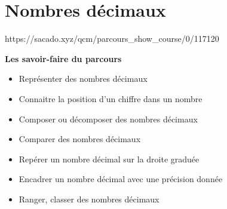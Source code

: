 \chapter{Nombres décimaux}
{https://sacado.xyz/qcm/parcours_show_course/0/117120}
{ 

 \begin{CpsCol}
 \textbf{Les savoir-faire du parcours} 
 \begin{itemize}
 \item Représenter des nombres décimaux 
 \item Connaitre la position d'un chiffre dans un nombre
 \item Composer ou décomposer des nombres décimaux  
 \item Comparer des nombres décimaux  
 \item Repérer un nombre décimal sur la droite graduée
 \item Encadrer un nombre décimal avec une précision donnée
 \item Ranger, classer des nombres décimaux 
 \end{itemize}
 \end{CpsCol}
}
%
%
% 
%
% 
%



